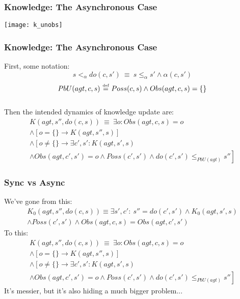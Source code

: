 \documentclass{beamer}
\newcommand{\isdef}{\hbox{$\stackrel{\mbox{\tiny def}}{=}$}}
\begin{document}
\begin{frame}
\frametitle{Knowledge: The Asynchronous Case}
\begin{center}
  \texttt{[image: k\_unobs]}
\end{center}
\end{frame}

\begin{frame}
\frametitle{Knowledge: The Asynchronous Case}
First, some notation:
\begin{equation*}
  s <_{\alpha} do(c,s')\ \equiv\ s \leq_{\alpha} s' \wedge \alpha(c,s')
\end{equation*}
\begin{equation*}
  PbU(agt,c,s)\ \isdef\ Poss(c,s) \wedge Obs(agt,c,s) = \{\}
\end{equation*}
\pause
\ \\
Then the intended dynamics of knowledge update are:
\begin{multline*}
  K(agt,s'',do(c,s))\ \equiv\ \exists o: Obs(agt,c,s) = o  \\
  \wedge \left[o = \{\} \rightarrow K(agt,s'',s)\right] \\
  \wedge \left[o \neq \{\} \rightarrow \exists c',s': K(agt,s',s)\right. \\
  \left.\wedge Obs(agt,c',s') = o \wedge Poss(c',s') \wedge do(c',s') \leq_{PbU(agt)} s''\right]
\end{multline*}
\end{frame}

\begin{frame}
\frametitle{Sync vs Async}
We've gone from this:
\begin{multline*}
 K_0(agt,s'',do(c,s)) \equiv \exists s',c':\ s''=do(c',s') \wedge K_0(agt,s',s)\\
  \wedge Poss(c',s') \wedge Obs(agt,c,s) = Obs(agt,c',s')
\end{multline*}
\pause
To this:
\begin{multline*}
  K(agt,s'',do(c,s))\ \equiv\ \exists o: Obs(agt,c,s) = o  \\
  \wedge \left[o = \{\} \rightarrow K(agt,s'',s)\right] \\
  \wedge \left[o \neq \{\} \rightarrow \exists c',s': K(agt,s',s)\right. \\
  \left.\wedge Obs(agt,c',s') = o \wedge Poss(c',s') \wedge do(c',s') \leq_{PbU(agt)} s''\right]
\end{multline*}
\pause
It's messier, but it's also hiding a much bigger problem...
\end{frame}
\end{document}
